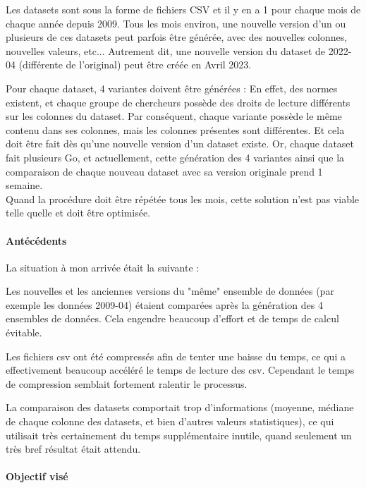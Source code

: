 Les datasets sont sous la forme de fichiers CSV et il y en a 1 pour chaque mois de chaque année depuis 2009.
Tous les mois environ, une nouvelle version d'un ou plusieurs de ces datasets peut parfois être générée, avec des nouvelles colonnes, nouvelles valeurs, etc...
Autrement dit, une nouvelle version du dataset de 2022-04 (différente de l'original) peut être créée en Avril 2023.

Pour chaque dataset, 4 variantes doivent être générées : En effet, des normes existent, et chaque groupe de chercheurs possède des droits de lecture différents sur les colonnes du dataset.
Par conséquent, chaque variante possède le même contenu dans ses colonnes, mais les colonnes présentes sont différentes.
Et cela doit être fait dès qu'une nouvelle version d'un dataset existe.
Or, chaque dataset fait plusieurs Go, et actuellement, cette génération des 4 variantes ainsi que la comparaison de chaque nouveau dataset avec sa version originale prend 1 semaine. 
\\

Quand la procédure doit être répétée tous les mois, cette solution n'est pas viable telle quelle et doit être optimisée.

\paragraph{Antécédents}

La situation à mon arrivée était la suivante :

Les nouvelles et les anciennes versions du "même" ensemble de données (par exemple les données 2009-04) étaient comparées après la génération des 4 ensembles de données.
Cela engendre beaucoup d'effort et de temps de calcul évitable.

Les fichiers csv ont été compressés afin de tenter une baisse du temps, ce qui a effectivement beaucoup accéléré le temps de lecture des csv. 
Cependant le temps de compression semblait fortement ralentir le processus. 

La comparaison des datasets comportait trop d'informations (moyenne, médiane de chaque colonne des datasets, et bien d'autres valeurs statistiques), ce qui utilisait très certainement du temps supplémentaire inutile, quand seulement un très bref résultat était attendu.

\paragraph{Objectif visé}

